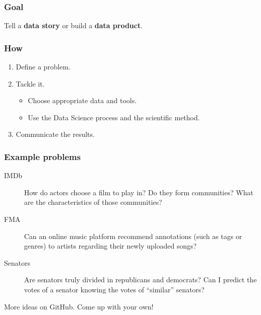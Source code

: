 \documentclass[aspectratio=169]{beamer}
\begin{document}

\begin{frame}
	\frametitle{Goal}
	\begin{center}
		\huge
		Tell a {\color{darkred}\textbf{data story}} or build a {\color{darkred}\textbf{data product}}.
	\end{center}
\end{frame}


\begin{frame}
	\frametitle{How}
	\begin{enumerate}
		\item Define a problem.
		\vfill
		\color{lightgray}
		\item Tackle it.
			\vspace{1em}
			\begin{itemize}
				\color{lightgray}
				\item Choose appropriate data and tools.
				\vspace{1em}
				\item Use the Data Science process and the scientific method.
			\end{itemize}
		\vfill
		\item Communicate the results.
	\end{enumerate}
\end{frame}


\begin{frame}
	\frametitle{Example problems}
	\begin{description}
		\item[IMDb] How do actors choose a film to play in? Do they form communities? What are the characteristics of those communities?
		\vfill
		\item[FMA] Can an online music platform recommend annotations (such as tags or genres) to artists regarding their newly uploaded songs?
		\vfill
		\item[Senators] Are senators truly divided in republicans and democrats? Can I predict the votes of a senator knowing the votes of ``similar'' senators?
	\end{description}
	\vfill
	More ideas on GitHub. Come up with your own!
\end{frame}
\end{document}
